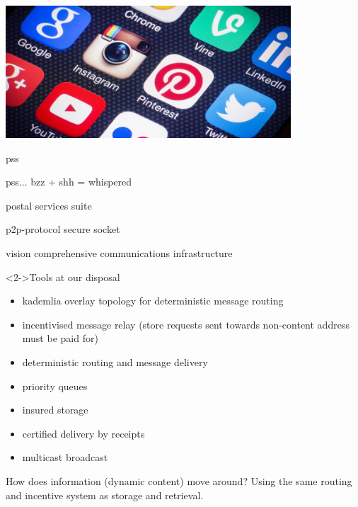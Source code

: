 

\begin{frame}[plain,c]
  \includegraphics[width=0.8\textwidth]{commsapps.jpg}
\end{frame}

\begin{frame}{pss}
\begin{block}{}
pss...  bzz + shh = whispered
\end{block}
\begin{block}{}
postal services suite
\end{block}
\begin{block}{}
p2p-protocol secure socket
\end{block}
\end{frame}


\begin{frame}
 \begin{block}{vision}
 comprehensive communications infrastructure
 \end{block}
 \begin{block}<2->{Tools at our disposal}
  \begin{itemize}
   \item kademlia overlay topology for deterministic message routing
   \item incentivised message relay (store requests sent towards non-content address must be paid for)
   \item deterministic routing and message delivery
   \item priority queues
   \item insured storage
   \item certified delivery by receipts
   \item multicast broadcast
  \end{itemize}
 \end{block}
\end{frame}


\begin{frame}
\begin{block}{How does information (dynamic content) move around?}
Using the same routing and incentive system as storage and retrieval.
\end{block}
\end{frame}


